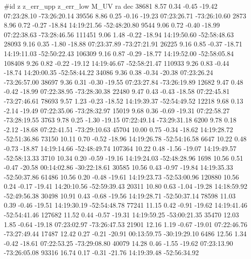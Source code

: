 #id z z_err_upp z_err_low M_UV ra dec
38681   8.57 0.34 -0.45     -19.42    07:23:28.10    -73:26:20.14
39556   8.86 0.25 -0.16     -19.23    07:23:26.71    -73:26:10.60
2873   8.96 0.72 -0.27     -18.84    14:19:21.56     -52:48:20.80
9544   9.06 0.72 -0.40     -18.99    07:22:38.63    -73:28:46.56
111451   9.06 1.48 -0.22     -18.94    14:19:50.60     -52:58:48.63
28093   9.16 0.35 -1.80     -18.88    07:23:37.89    -73:27:21.91
26225   9.16 0.85 -0.37     -18.71    14:19:11.03     -52:50:22.43
106309   9.16 0.87 -0.29     -18.77    14:19:52.00     -52:58:05.84
108408   9.26 0.82 -0.22     -19.12    14:19:46.67     -52:58:21.47
110933   9.26 0.83 -0.44     -18.74    14:20:00.35     -52:58:44.22
34086   9.36 0.38 -0.34     -20.38    07:23:26.24    -73:26:57.00
38697   9.36 0.31 -0.30     -19.55    07:23:27.84    -73:26:19.89
12682   9.47 0.48 -0.42     -18.99    07:22:38.95    -73:28:30.38
22480   9.47 0.43 -0.43     -18.58    07:22:45.81    -73:27:46.61
78693   9.57 1.23 -0.23     -18.52    14:19:39.37     -52:54:49.52
12218   9.68 0.13 -2.14     -19.49    07:22:35.06    -73:28:32.97
15019   9.68 0.36 -0.69     -19.31    07:22:58.27    -73:28:19.55
3763   9.78 0.25 -1.30     -19.15    07:22:49.14    -73:29:31.18
6200   9.78 0.18 -2.12     -18.68    07:22:41.51    -73:29:10.63
45704   10.00 0.75 -0.34     -18.62    14:19:28.72     -52:51:36.86
73150   10.11 0.70 -0.52     -18.96    14:19:26.78     -52:54:16.58
6647   10.22 0.48 -0.73     -18.87    14:19:14.66     -52:48:49.74
107364   10.22 0.48 -1.56     -19.07    14:19:49.57     -52:58:13.33
3710   10.34 0.20 -0.59     -19.16    14:19:24.03     -52:48:28.96
1698   10.56 0.51 -0.47     -20.58    00:14:02.86    -30:22:18.61
30585   10.56 0.43 -0.97     -19.84    14:19:35.33     -52:50:37.86
61486   10.56 0.20 -0.48     -19.61    14:19:23.73     -52:53:00.96
120880   10.56 0.24 -0.17     -19.41    14:20:10.56     -52:59:39.43
20311   10.80 0.63 -1.04     -19.28    14:18:59.92     -52:49:56.38
30498   10.91 0.43 -0.68     -19.56    14:19:28.71     -52:50:37.14
78598   11.03 0.39 -0.46     -19.51    14:19:30.19     -52:54:48.78
77241   11.15 0.42 -0.91     -19.62    14:19:41.46     -52:54:41.46
127682   11.52 0.44 -0.57     -19.31    14:19:59.25     -53:00:21.35
35470   12.03 1.85 -0.64     -19.18    07:23:02.97    -73:26:47.53
21901   12.16 1.19 -0.67     -19.01    07:22:46.76    -73:27:49.44
17487   12.42 0.27 -0.21     -20.91    00:13:59.75    -30:19:29.10
6486   12.56 1.34 -0.42     -18.61    07:22:53.25    -73:29:08.80
40079   14.28 0.46 -1.55     -19.62    07:23:13.90    -73:26:05.08
93316   16.74 0.17 -0.31     -21.76    14:19:39.48     -52:56:34.92
